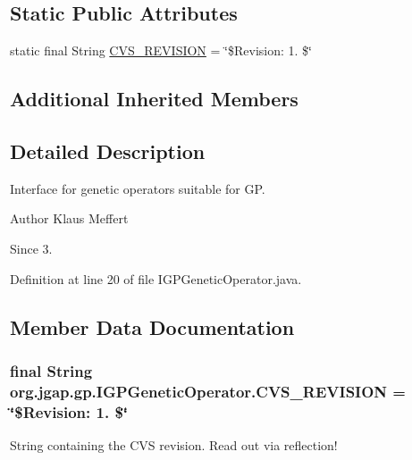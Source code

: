 \subsection*{Static Public Attributes}
\begin{DoxyCompactItemize}
\item 
static final String \hyperlink{interfaceorg_1_1jgap_1_1gp_1_1_i_g_p_genetic_operator_a061738878685913c42ef73bb573ea1f5}{C\-V\-S\-\_\-\-R\-E\-V\-I\-S\-I\-O\-N} = \char`\"{}\$Revision\-: 1. \$\char`\"{}
\end{DoxyCompactItemize}
\subsection*{Additional Inherited Members}


\subsection{Detailed Description}
Interface for genetic operators suitable for G\-P.

\begin{DoxyAuthor}{Author}
Klaus Meffert 
\end{DoxyAuthor}
\begin{DoxySince}{Since}
3. 
\end{DoxySince}


Definition at line 20 of file I\-G\-P\-Genetic\-Operator.\-java.



\subsection{Member Data Documentation}
\hypertarget{interfaceorg_1_1jgap_1_1gp_1_1_i_g_p_genetic_operator_a061738878685913c42ef73bb573ea1f5}{
\subsubsection[{C\-V\-S\-\_\-\-R\-E\-V\-I\-S\-I\-O\-N}]{\setlength{\rightskip}{0pt plus 5cm}final String org.\-jgap.\-gp.\-I\-G\-P\-Genetic\-Operator.\-C\-V\-S\-\_\-\-R\-E\-V\-I\-S\-I\-O\-N = \char`\"{}\$Revision\-: 1. \$\char`\"{}\hspace{0.3cm}{\ttfamily [static]}}}\label{interfaceorg_1_1jgap_1_1gp_1_1_i_g_p_genetic_operator_a061738878685913c42ef73bb573ea1f5}
String containing the C\-V\-S revision. Read out via reflection! 

